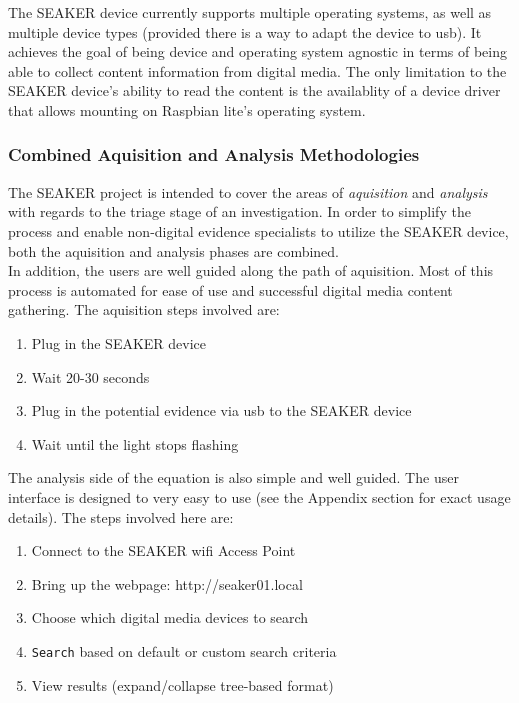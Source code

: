 \documentclass[12pt]{article}
\begin{document}
The SEAKER device currently supports multiple operating systems, as well as multiple
device types (provided there is a way to adapt the device to \gls{usb}). It achieves the goal of
being device and operating system agnostic in terms of being able to collect content
information from digital media. The only limitation to the SEAKER device's ability
to read the content is the availablity of a device driver that allows mounting on Raspbian
lite's operating system.\\

\subsubsection{Combined Aquisition and Analysis Methodologies}

The SEAKER project is intended to cover the areas of {\em aquisition} and {\em analysis}
with regards to the triage stage of an investigation.  In order to simplify the process and
enable non-digital evidence specialists to utilize the SEAKER device, both the
aquisition and analysis phases are combined.\\

In addition, the users are well guided along the path of aquisition.  Most of this process is
automated for ease of use and successful digital media content gathering.  The aquisition 
steps involved are:

\vspace{0.5 cm}
\begin{enumerate}
  \item Plug in the SEAKER device
  \item Wait 20-30 seconds
  \item Plug in the potential evidence via \gls{usb} to the SEAKER device
  \item Wait until the light stops flashing
\end{enumerate}
\vspace{0.5 cm}

The analysis side of the equation is also simple and well guided.  The user interface is 
designed to very easy to use (see the Appendix section for exact usage details).  The steps
involved here are:

\vspace{0.5 cm}
\begin{enumerate}
  \item Connect to the SEAKER \gls{wifi} Access Point
  \item Bring up the webpage: http://seaker01.local
  \item Choose which digital media devices to search
  \item \verb|Search| based on default or custom search criteria
  \item View results (expand/collapse tree-based format)
\end{enumerate}
\vspace{0.5 cm}
\end{document}
